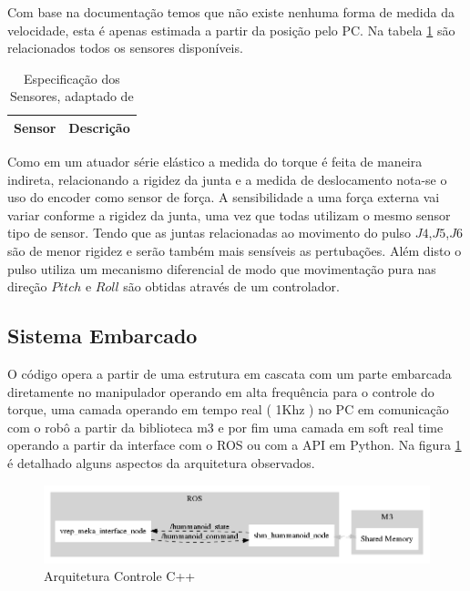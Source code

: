 
Com base na documentação temos que não existe nenhuma forma de medida da velocidade, esta é apenas estimada a partir da posição pelo PC. Na tabela \ref{tab:a2armSensorDoc} são relacionados todos os sensores disponíveis.


\begin{table}[H]
    \centering
    \caption{Especificação dos Sensores, adaptado de \cite{mekaguide}}
    \begin{tabular}{ll}
         \hline
         Sensor & Descrição\\
         \hline
         
         \hline
    \end{tabular}
    \label{tab:a2armSensorDoc}
\end{table}

Como em um atuador série elástico a medida do torque é feita de maneira indireta, relacionando a rigidez da junta e a medida de deslocamento nota-se o uso do encoder como sensor de força. A sensibilidade a uma força externa vai variar conforme a rigidez da junta, uma vez que todas utilizam o mesmo sensor tipo de sensor. Tendo que as juntas relacionadas ao movimento do pulso $J4$,$J5$,$J6$ são de menor rigidez e serão também mais sensíveis as pertubações. Além disto o pulso utiliza um mecanismo diferencial\cite{nobody} de modo que movimentação pura nas direção $Pitch$ e $Roll$ são obtidas através de um controlador.

\subsection{Sistema Embarcado}


O código opera a partir de uma estrutura em cascata com um parte embarcada diretamente no manipulador operando em alta frequência para o controle do torque, uma camada operando em tempo real ( 1Khz ) no PC em comunicação com o robô a partir da biblioteca m3 e por fim uma camada em soft real time operando a partir da interface com o ROS ou com a API em Python. Na figura \ref{fig:shm_arch} é detalhado alguns aspectos da arquitetura observados.

\begin{figure}[H]
    \centering
    \includegraphics[width=1\linewidth]{figs/shm_arch}
    \caption{Arquitetura Controle C++}
    \label{fig:shm_arch}
\end{figure}

